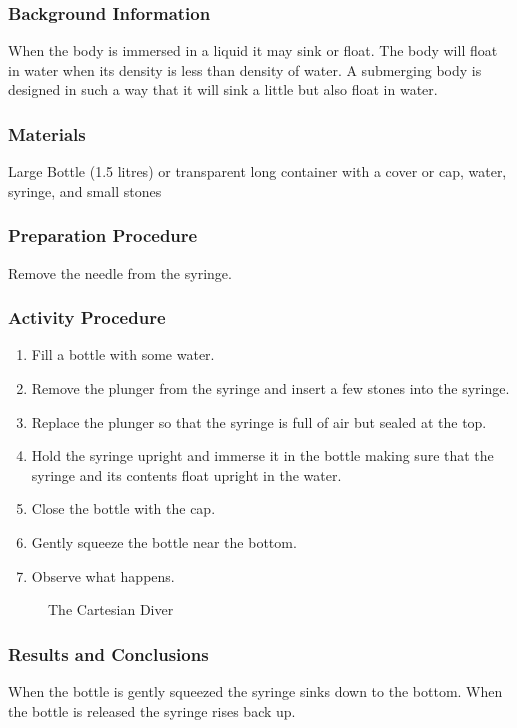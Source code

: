 \subsubsection*{Background Information}
When the body is immersed in a liquid it may sink or float. The body will float in water when its density is less than density of water. A submerging body is designed in such a way that it will sink a little but also float in water. 

\subsubsection*{Materials}
Large Bottle (1.5 litres) or transparent long container with a cover or cap, water, syringe, and small stones

\subsubsection*{Preparation Procedure}
Remove the needle from the syringe.

\subsubsection*{Activity Procedure}
\begin{enumerate}
\item{Fill a bottle with some water.}
\item{Remove the plunger from the syringe and insert a few stones into the syringe.}
\item{Replace the plunger so that the syringe is full of air but sealed at the top.} 
\item{Hold the syringe upright and immerse it in the bottle making sure that the syringe and its contents float upright in the water.}
\item{Close the bottle with the cap.}
\item{Gently squeeze the bottle near the bottom.} 
\item{Observe what happens.}
\end{enumerate}

\begin{figure}
\begin{center}
\def\svgwidth{150pt}

\caption{The Cartesian Diver}
\label{fig:cartesian-diver}
\end{center}
\end{figure}

\subsubsection*{Results and Conclusions}
When the bottle is gently squeezed the syringe sinks down to the bottom. When the bottle is released the syringe rises back up. 


